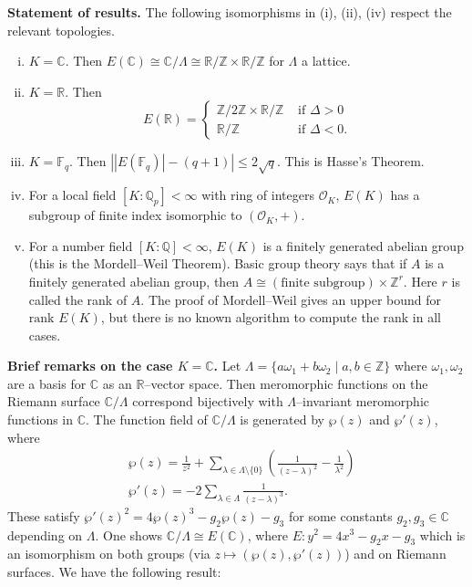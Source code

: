\documentclass{article}
\theoremstyle{definition}
\begin{document}
\textbf{Statement of results.}
The following isomorphisms in (i), (ii), (iv) respect the relevant topologies.
\begin{enumerate}[(i)]
    \item $K=\mathbb{C}$. Then $E(\mathbb{C}) \cong \mathbb{C}/\Lambda \cong \mathbb{R}/\mathbb{Z} \times \mathbb{R}/\mathbb{Z}$ for $\Lambda$ a lattice.
    \item $K=\mathbb{R}$. Then \[
    E(\mathbb{R}) = \begin{cases}
        \mathbb{Z}/2\mathbb{Z} \times \mathbb{R}/\mathbb{Z}& \text{ if }\Delta>0\\
        \mathbb{R}/\mathbb{Z} &\text{ if }\Delta<0.
    \end{cases}
    \] 
    \item $K = \mathbb{F}_q$. Then $\left| \left|E(\mathbb{F}_q)\right| - (q+1)\right| \le 2\sqrt{q}$. This is Hasse's Theorem.
    \item For a local field $[K:\mathbb{Q}_p] <\infty$ with ring of integers $\mathcal{O}_K$, $E(K)$ has a subgroup of finite index isomorphic to $(\mathcal{O}_K,+)$.
    \item For a number field $[K:\mathbb{Q}]<\infty$, $E(K)$ is a finitely generated abelian group (this is the Mordell--Weil Theorem).
    Basic group theory says that if $A$ is a finitely generated abelian group, then $A \cong (\text{finite subgroup})\times \mathbb{Z}^r$. Here $r$ is called the rank of $A$. The proof of Mordell--Weil gives an upper bound for $\text{rank }E(K)$, but there is no known algorithm to compute the rank in all cases.
\end{enumerate}
\textbf{Brief remarks on the case $K=\mathbb{C}$.} Let $\Lambda = \{a \omega_1 + b \omega_2 \mid a,b \in \mathbb{Z}\}$ where $\omega_1,\omega_2$ are a basis for $\mathbb{C}$ as an $\mathbb{R}$--vector space. Then meromorphic functions on the Riemann surface $\mathbb{C}/\Lambda$ correspond bijectively with $\Lambda$--invariant meromorphic functions in $\mathbb{C}$. The function field of $\mathbb{C}/\Lambda$ is generated by $\wp(z)$ and $\wp'(z)$, where 
\begin{align*}
    &\wp(z) = \frac{1}{z^2}+\sum_{\lambda \in \Lambda \setminus \{0\}}^{} \left(\frac{1}{(z-\lambda)^2} - \frac{1}{\lambda^2}\right)\\
    &\wp'(z) = -2\sum_{\lambda \in \Lambda}^{} \frac{1}{(z-\lambda)^3}.
\end{align*}
These satisfy $\wp'(z)^2 = 4\wp(z)^3 - g_2\wp(z) - g_3$ for some constants $g_2,g_3 \in \mathbb{C}$ depending on $\Lambda$. One shows $\mathbb{C}/\Lambda \cong E(\mathbb{C})$, where $E: y^2 = 4x^3 - g_2x -g_3$ which is an isomorphism on both groups (via $z \mapsto (\wp(z),\wp'(z))$) and on Riemann surfaces. We have the following result:
\end{document}
